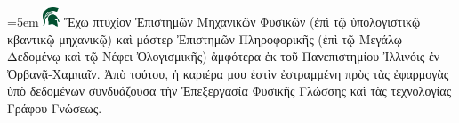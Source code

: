 




        \font=5em \includegraphics[width=5mm]{icon.png} Ἔχω πτυχίον Ἐπιστημῶν Μηχανικῶν Φυσικῶν (ἐπὶ τῷ ὑπολογιστικῷ κβαντικῷ μηχανικῷ) καὶ μάστερ Ἐπιστημῶν Πληροφορικῆς (ἐπὶ τῷ Μεγάλῳ Δεδομένῳ καὶ τῷ Νέφει Ὀλογισμικῆς) ἀμφότερα ἐκ τοῦ Πανεπιστημίου Ἰλλινόις ἐν Ὀρβανᾷ-Χαμπαῖν. Ἀπὸ τούτου, ἡ καριέρα μου ἐστὶν ἐστραμμένη πρὸς τὰς ἐφαρμογὰς ὑπὸ δεδομένων συνδυάζουσα τὴν Ἐπεξεργασία Φυσικῆς Γλώσσης καὶ τὰς τεχνολογίας Γράφου Γνώσεως.




